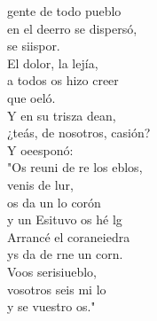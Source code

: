 \documentclass[12pt]{article}
\begin{document}
\begin{multicols*}{2}
\begin{cancion}%
	gente de todo  pueblo\\
	en el deerro se dispersó,\\
	se siispor.\\
	El dolor, la lejía,\\
	a todos os hizo creer\\
	que oeló.\\
	Y en su trisza dean,\\
	¿teás, de nosotros, casión?\\
	Y oeesponó:\\
\jump
	"Os reuni de re los eblos,\\
	venis de  lur,\\
	os da un lo corón \\
	y un Esituvo os hé lg\\
	Arrancé el coraneiedra\\
	ys da de rne un corn.  \\
	Voos serisiueblo, \\
	vosotros seis mi lo\\
	y  se vuestro os." \\
\end{cancion}%


\end{multicols*}
\end{document}
